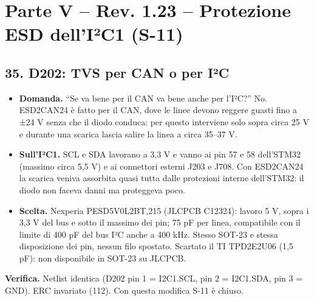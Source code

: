 \clearpage
\section[Parte V – Rev. 1.23 – Protezione ESD dell'I²C1 (S-11)]{Parte V – Rev. 1.23 – Protezione ESD dell'I²C1 (S-11)}

\subsection[35. D202: TVS per CAN o per I²C]{35. D202: TVS per CAN o per I²C}

\begin{itemize}
\item \textbf{Domanda.} \textquotedblleft{}Se va bene per il CAN va bene anche per l'I²C?\textquotedblright{} No. ESD2CAN24 è fatto per il CAN, dove le linee devono reggere guasti fino a ±24 V senza che il diodo conduca: per questo interviene solo sopra circa 25 V e durante una scarica lascia salire la linea a circa 35–37 V.
\item \textbf{Sull'I²C1.} SCL e SDA lavorano a 3,3 V e vanno ai pin 57 e 58 dell'STM32 (massimo circa 5,5 V) e ai connettori esterni J203 e J708. Con ESD2CAN24 la scarica veniva assorbita quasi tutta dalle protezioni interne dell'STM32: il diodo non faceva danni ma proteggeva poco.
\item \textbf{Scelta.} Nexperia PESD5V0L2BT,215 (JLCPCB C12324): lavoro 5 V, sopra i 3,3 V del bus e sotto il massimo dei pin; 75 pF per linea, compatibile con il limite di 400 pF del bus I²C anche a 400 kHz. Stesso SOT-23 e stessa disposizione dei pin, nessun filo spostato. Scartato il TI TPD2E2U06 (1,5 pF): non disponibile in SOT-23 su JLCPCB.
\end{itemize}

\textbf{Verifica.} Netlist identica (D202 pin 1 = I2C1.SCL, pin 2 = I2C1.SDA, pin 3 = GND). ERC invariato (112). Con questa modifica S-11 è chiuso.
